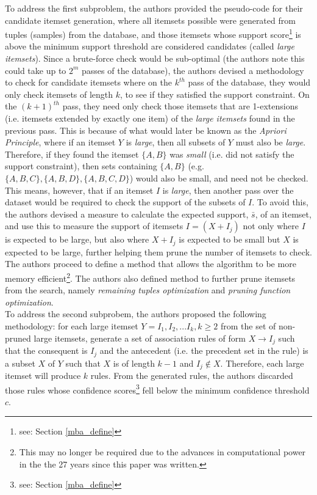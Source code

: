 \documentclass[a4paper,11pt]{article}
\begin{document}
To address the first subproblem, the authors provided the pseudo-code for their candidate itemset generation,  where all itemsets possible were generated from tuples (samples) from the database,  and those itemsets whose support score\footnote{see: Section \ref{mba_define}} is above the minimum support threshold are considered candidates (called \textit{large itemsets}).  Since a brute-force check would be sub-optimal  (the authors note this could take up to $2^m$ passes of the database),  the authors devised a methodology to check for candidate itemsets where on the $k^{th}$ pass of the database, they would only check itemsets of length $k$, to see if they satisfied the support constraint. On the $(k+1)^{th}$ pass, they need only check those itemsets that are 1-extensions (i.e.  itemsets extended by exactly one item) of the \textit{large itemsets} found in the previous pass. This is because of what would later be known as the \textit{Apriori Principle}, where if an itemset $Y$ is \textit{large}, then all subsets of $Y$ must also be \textit{large}. Therefore, if they found the itemset $\{A,B\}$ was \textit{small} (i.e. did not satisfy the support constraint), then sets containing $\{A,B\}$ (e.g. $\{A,B, C\}, \{A,B, D\}, \{A,B, C, D\}$) would also be small, and need not be checked. This means, however, that if an itemset $I$ is \textit{large}, then another pass over the dataset would be required to check the support of the subsets of $I$. To avoid this, the authors devised a measure to calculate the expected support, $\bar{s}$, of an itemset,  and use this to measure the support of itemsets $I = (X + I_j)$ not only where $I$ is expected to be large, but also where $X+I_j$ is expected to be small but $X$ is expected to be large, further helping them prune the number of itemsets to check.  The authors proceed to define a method that allows the algorithm to be more memory efficient\footnote{This may no longer be required due to the advances in computational power in the the 27 years since this paper was written.}. The authors also defined method to further prune itemsets from the search, namely \textit{remaining tuples optimization} and \textit{pruning function optimization}.\\
To address the second subprobem,  the authors proposed the following methodology: for each large itemset $Y = I_1, I_2,...I_k, k\geq 2$ from the set of non-pruned large itemsets, generate a set of association rules of form $X \rightarrow I_j$ such that the consequent is $I_j$ and the antecedent (i.e. the precedent set in the rule) is a subset $X$ of $Y$ such that $X$ is of length $k-1$ and $I_j \notin X$. Therefore, each large itemset will produce $k$ rules. From the generated rules, the authors discarded those rules whose confidence scores\footnote{see: Section \ref{mba_define}} fell below the minimum confidence threshold $c$.\\
\end{document}
